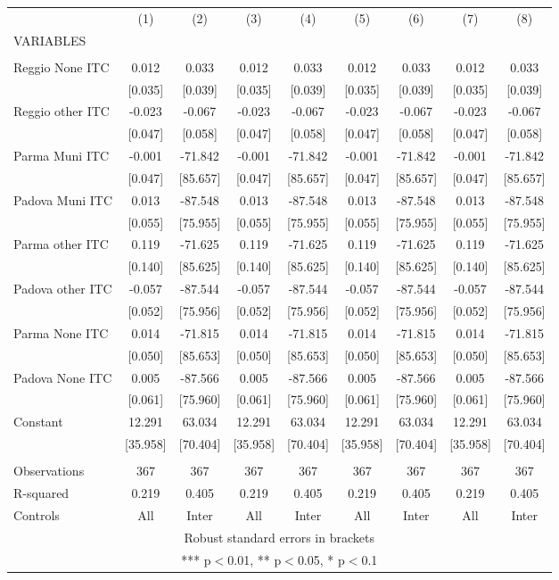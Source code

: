\begin{tabular}{lcccccccc} \hline
 & (1) & (2) & (3) & (4) & (5) & (6) & (7) & (8) \\
VARIABLES &  &  &  &  &  &  &  &  \\ \hline
 &  &  &  &  &  &  &  &  \\
Reggio None ITC & 0.012 & 0.033 & 0.012 & 0.033 & 0.012 & 0.033 & 0.012 & 0.033 \\
 & [0.035] & [0.039] & [0.035] & [0.039] & [0.035] & [0.039] & [0.035] & [0.039] \\
Reggio other ITC & -0.023 & -0.067 & -0.023 & -0.067 & -0.023 & -0.067 & -0.023 & -0.067 \\
 & [0.047] & [0.058] & [0.047] & [0.058] & [0.047] & [0.058] & [0.047] & [0.058] \\
Parma Muni ITC & -0.001 & -71.842 & -0.001 & -71.842 & -0.001 & -71.842 & -0.001 & -71.842 \\
 & [0.047] & [85.657] & [0.047] & [85.657] & [0.047] & [85.657] & [0.047] & [85.657] \\
Padova Muni ITC & 0.013 & -87.548 & 0.013 & -87.548 & 0.013 & -87.548 & 0.013 & -87.548 \\
 & [0.055] & [75.955] & [0.055] & [75.955] & [0.055] & [75.955] & [0.055] & [75.955] \\
Parma other ITC & 0.119 & -71.625 & 0.119 & -71.625 & 0.119 & -71.625 & 0.119 & -71.625 \\
 & [0.140] & [85.625] & [0.140] & [85.625] & [0.140] & [85.625] & [0.140] & [85.625] \\
Padova other ITC & -0.057 & -87.544 & -0.057 & -87.544 & -0.057 & -87.544 & -0.057 & -87.544 \\
 & [0.052] & [75.956] & [0.052] & [75.956] & [0.052] & [75.956] & [0.052] & [75.956] \\
Parma None ITC & 0.014 & -71.815 & 0.014 & -71.815 & 0.014 & -71.815 & 0.014 & -71.815 \\
 & [0.050] & [85.653] & [0.050] & [85.653] & [0.050] & [85.653] & [0.050] & [85.653] \\
Padova None ITC & 0.005 & -87.566 & 0.005 & -87.566 & 0.005 & -87.566 & 0.005 & -87.566 \\
 & [0.061] & [75.960] & [0.061] & [75.960] & [0.061] & [75.960] & [0.061] & [75.960] \\
Constant & 12.291 & 63.034 & 12.291 & 63.034 & 12.291 & 63.034 & 12.291 & 63.034 \\
 & [35.958] & [70.404] & [35.958] & [70.404] & [35.958] & [70.404] & [35.958] & [70.404] \\
 &  &  &  &  &  &  &  &  \\
Observations & 367 & 367 & 367 & 367 & 367 & 367 & 367 & 367 \\
R-squared & 0.219 & 0.405 & 0.219 & 0.405 & 0.219 & 0.405 & 0.219 & 0.405 \\
 Controls & All & Inter & All & Inter & All & Inter & All & Inter \\ \hline
\multicolumn{9}{c}{ Robust standard errors in brackets} \\
\multicolumn{9}{c}{ *** p$<$0.01, ** p$<$0.05, * p$<$0.1} \\
\end{tabular}
